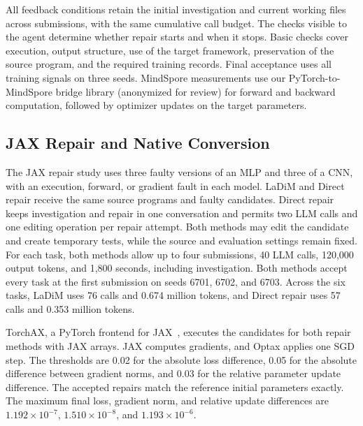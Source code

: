 All feedback conditions retain the initial investigation and current working files across submissions, with the same cumulative call budget. The checks visible to the agent determine whether repair starts and when it stops. Basic checks cover execution, output structure, use of the target framework, preservation of the source program, and the required training records. Final acceptance uses all training signals on three seeds. MindSpore measurements use our PyTorch-to-MindSpore bridge library (anonymized for review) for forward and backward computation, followed by optimizer updates on the target parameters.

\subsection{JAX Repair and Native Conversion}
\label{sec:jax-protocol}

The JAX repair study uses three faulty versions of an MLP and three of a CNN, with an execution, forward, or gradient fault in each model. LaDiM and Direct repair receive the same source programs and faulty candidates. Direct repair keeps investigation and repair in one conversation and permits two LLM calls and one editing operation per repair attempt. Both methods may edit the candidate and create temporary tests, while the source and evaluation settings remain fixed. For each task, both methods allow up to four submissions, 40 LLM calls, 120,000 output tokens, and 1,800 seconds, including investigation. Both methods accept every task at the first submission on seeds 6701, 6702, and 6703. Across the six tasks, LaDiM uses 76 calls and 0.674 million tokens, and Direct repair uses 57 calls and 0.353 million tokens.

TorchAX, a PyTorch frontend for JAX~\citep{google2025torchax}, executes the candidates for both repair methods with JAX arrays. JAX computes gradients, and Optax applies one SGD step. The thresholds are 0.02 for the absolute loss difference, 0.05 for the absolute difference between gradient norms, and 0.03 for the relative parameter update difference. The accepted repairs match the reference initial parameters exactly. The maximum final loss, gradient norm, and relative update differences are $1.192\times10^{-7}$, $1.510\times10^{-8}$, and $1.193\times10^{-6}$.

